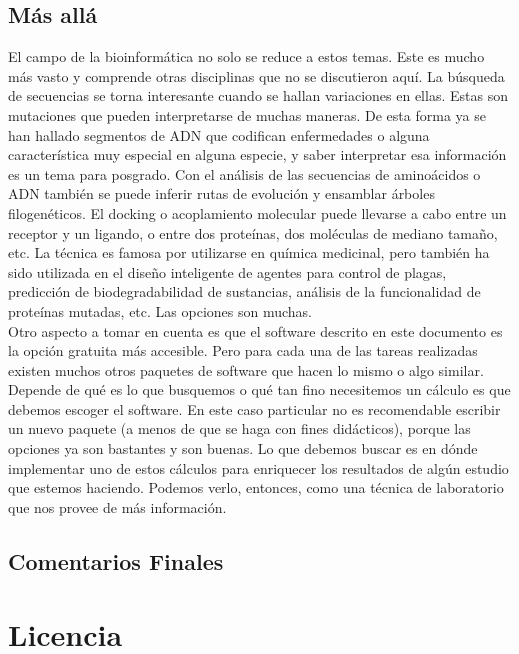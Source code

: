 \documentclass[10pt,letterpaper]{article}
\begin{document}
\subsection{M\'as all\'a}
El campo de la bioinform\'atica no solo se reduce a estos temas. Este es mucho m\'as vasto y comprende otras disciplinas que no se discutieron aqu\'i. La b\'usqueda de secuencias se torna interesante cuando se hallan variaciones en ellas. Estas son mutaciones que pueden interpretarse de muchas maneras. De esta forma ya se han hallado segmentos de ADN que codifican enfermedades o alguna caracter\'istica muy especial en alguna especie, y saber interpretar esa informaci\'on es un tema para posgrado. Con el an\'alisis de las secuencias de amino\'acidos o ADN tambi\'en se puede inferir rutas de evoluci\'on y ensamblar \'arboles filogen\'eticos. El docking o acoplamiento molecular puede llevarse a cabo entre un receptor y un ligando, o entre dos prote\'inas, dos mol\'eculas de mediano tama\~no, etc. La t\'ecnica es famosa por utilizarse en qu\'imica medicinal, pero tambi\'en ha sido utilizada en el dise\~no inteligente de agentes para control de plagas, predicci\'on de biodegradabilidad de sustancias, an\'alisis de la funcionalidad de prote\'inas mutadas, etc. Las opciones son muchas.\\

Otro aspecto a tomar en cuenta es que el software descrito en este documento es la opci\'on gratuita m\'as accesible. Pero para cada una de las tareas realizadas existen muchos otros paquetes de software que hacen lo mismo o algo similar. Depende de qu\'e es lo que busquemos o qu\'e tan fino necesitemos un c\'alculo es que debemos escoger el software. En este caso particular no es recomendable escribir un nuevo paquete (a menos de que se haga con fines did\'acticos), porque las opciones ya son bastantes y son buenas. Lo que debemos buscar es en d\'onde implementar uno de estos c\'alculos para enriquecer los resultados de alg\'un estudio que estemos haciendo. Podemos verlo, entonces, como una t\'ecnica de laboratorio que nos provee de m\'as informaci\'on.

\subsection{Comentarios Finales}



\section*{Licencia}
\end{document}
